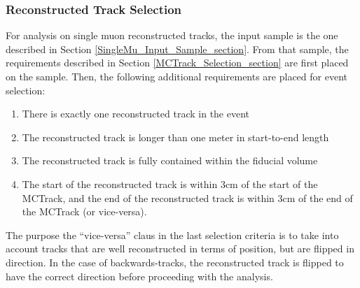 \subsubsection{Reconstructed Track Selection}\label{RecoTrack_Selection_section}
For analysis on single muon reconstructed tracks, the input sample is the one described in Section \ref{SingleMu_Input_Sample_section}. From that sample, the requirements described in Section \ref{MCTrack_Selection_section} are first placed on the sample. Then, the following additional requirements are placed for event selection:
\begin{enumerate}
	\item There is exactly one reconstructed track in the event
	\item The reconstructed track is longer than one meter in start-to-end length
	\item The reconstructed track is fully contained within the fiducial volume
	\item The start of the reconstructed track is within 3cm of the start of the {\sc MCTrack}, and the end of the reconstructed track is within 3cm of the end of the {\sc MCTrack} (or vice-versa).
\end{enumerate}
The purpose the ``vice-versa'' claus in the last selection criteria is to take into account tracks that are well reconstructed in terms of position, but are flipped in direction. In the case of backwards-tracks, the reconstructed track is flipped to have the correct direction before proceeding with the analysis.



